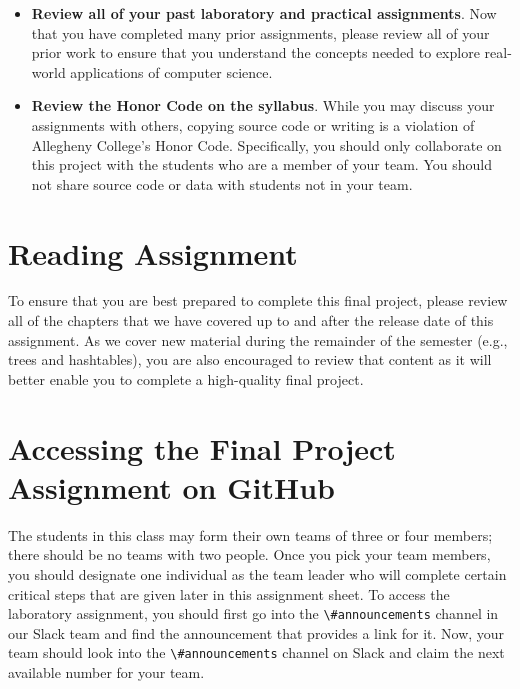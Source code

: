 \documentclass[11pt]{article}
\newcommand{\channel}[1]{\lstinline{#1}}
\begin{document}
\begin{itemize}
\item {\bf Review all of your past laboratory and practical assignments}. Now
  that you have completed many prior assignments, please review all of your
  prior work to ensure that you understand the concepts needed to explore
  real-world applications of computer science.

\item {\bf Review the Honor Code on the syllabus}. While you may discuss your
  assignments with others, copying source code or writing is a violation of
  Allegheny College's Honor Code. Specifically, you should only collaborate on
  this project with the students who are a member of your team. You should not
  share source code or data with students not in your team.

\end{itemize}

\section*{Reading Assignment}

To ensure that you are best prepared to complete this final project, please
review all of the chapters that we have covered up to and after the release date
of this assignment. As we cover new material during the remainder of the
semester (e.g., trees and hashtables), you are also encouraged to review that
content as it will better enable you to complete a high-quality final project.

\section*{Accessing the Final Project Assignment on GitHub}

The students in this class may form their own teams of three or four members;
there should be no teams with two people. Once you pick your team members, you
should designate one individual as the team leader who will complete certain
critical steps that are given later in this assignment sheet. To access the
laboratory assignment, you should first go into the \channel{\#announcements}
channel in our Slack team and find the announcement that provides a link for it.
Now, your team should look into the \channel{\#announcements} channel on Slack
and claim the next available number for your team.
\end{document}
